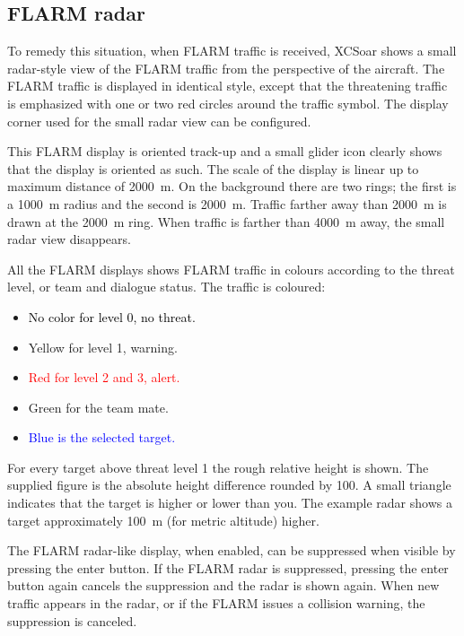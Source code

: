 \subsection*{FLARM radar}

To remedy this situation, when FLARM traffic is received, XCSoar shows a 
small radar-style view of the FLARM
traffic from the perspective of the aircraft.  The FLARM traffic is
displayed in identical style, except that the threatening traffic is emphasized 
with one or two red circles around the traffic symbol.  The display corner used
for the small radar view can be configured.

This FLARM display is oriented track-up and a small glider icon
clearly shows that the display is oriented as such.  The scale of the
display is linear up to maximum distance of 2000~m.  On the
background there are two rings; the first is a 1000~m radius and the second
is 2000~m.  Traffic farther away than 2000~m is drawn at the 2000~m ring.
When traffic is farther than 4000~m away, the small radar view disappears.

All the FLARM displays shows FLARM traffic in colours according to
the threat level, or team and dialogue status.  The traffic is coloured:
\begin{itemize}
\item \textcolor{black} {No color for level 0, no threat.} 
\item \textcolor{warning} { Yellow for level 1, warning.}
\item \textcolor{red} {Red for level 2 and 3, alert.}
\item \textcolor{teammate} {Green for the team mate.}
\item \textcolor{blue} {Blue is the selected target.}
\end{itemize}

For every target above threat level 1 the rough relative height is shown. The
supplied figure is the absolute height difference rounded by 100.  A small
triangle indicates that the target is higher or lower than you.  The example
radar shows a target approximately 100~m (for metric altitude) higher.

The FLARM radar-like display, when enabled, can be suppressed when
visible by pressing the enter button.  If the
FLARM radar is suppressed, pressing the enter button again cancels the
suppression and the radar is shown again.  When new traffic appears in
the radar, or if the FLARM issues a collision warning, the suppression
is canceled.


